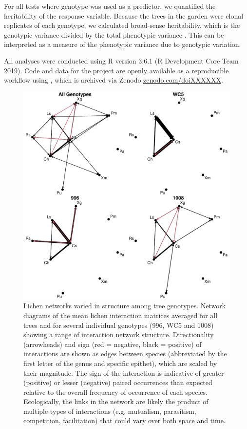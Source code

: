 \documentclass[fleqn,12pt]{olplainarticle}
\begin{document}
For all tests where genotype was used as a predictor, we quantified
the heritability of the response variable. Because the trees in the
garden were clonal replicates of each genotype, we calculated
broad-sense heritability, which is the genotypic variance divided by
the total phenotypic variance \citep{Conner2004ATextbook}. This can be
interpreted as a measure of the phenotypic variance due to genotypic
variation. 

All analyses were conducted using R version 3.6.1 (R Development Core
Team 2019). Code and data for the project are openly available as a
reproducible workflow using  \citep{drake}, which is
archived via Zenodo \url{zenodo.com/doiXXXXXX}. 

\begin{figure}[ht]
\centering
\includegraphics[width=\linewidth]{figures/cn_onc.pdf}
\caption{Lichen networks varied in structure among tree
  genotypes. Network diagrams of the mean lichen interaction matrices
  averaged for all trees and for several individual genotypes (996,
  WC5 and 1008) showing a range of interaction network
  structure. Directionality (arrowheads) and sign (red = negative,
  black = positive) of interactions are shown as edges between species
  (abbreviated by the first letter of the genus and specific epithet),
  which are scaled by their magnitude. The sign of the interaction is
  indicative of greater (positive) or lesser (negative) paired
  occurrences than expected relative to the overall frequency of
  occurrence of each species. Ecologically, the links in the network
  are likely the product of multiple types of interactions
  (e.g. mutualism, parasitism, competition, facilitation) that could
  vary over both space and time.}
\label{fig:geno_nets}
\end{figure}
\end{document}
